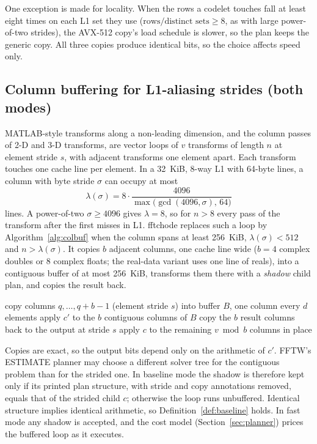 \documentclass[10pt]{article}
\theoremstyle{definition}
\begin{document}
One exception is made for locality. When the rows a codelet touches fall at least eight times on each L1 set they use ($\text{rows}/\text{distinct sets}\ge8$, as with large power-of-two strides), the AVX-512 copy's load schedule is slower, so the plan keeps the generic copy. All three copies produce identical bits, so the choice affects speed only.

\subsection{Column buffering for L1-aliasing strides (both modes)}\label{sec:colbuf}

MATLAB-style transforms along a non-leading dimension, and the column passes of 2-D and 3-D transforms, are vector loops of $v$ transforms of length $n$ at element stride $s$, with adjacent transforms one element apart. Each transform touches one cache line per element. In a 32~KiB, 8-way L1 with 64-byte lines, a column with byte stride $\sigma$ can occupy at most
\begin{equation}
\lambda(\sigma)=8\cdot\frac{4096}{\max\big(\gcd(4096,\sigma),\,64\big)}
\end{equation}
lines. A power-of-two $\sigma\ge4096$ gives $\lambda=8$, so for $n>8$ every pass of the transform after the first misses in L1. fftchode replaces such a loop by Algorithm~\ref{alg:colbuf} when the column spans at least 256~KiB, $\lambda(\sigma)<512$ and $n>\lambda(\sigma)$. It copies $b$ adjacent columns, one cache line wide ($b=4$ complex doubles or 8 complex floats; the real-data variant uses one line of reals), into a contiguous buffer of at most 256~KiB, transforms them there with a \emph{shadow} child plan, and copies the result back.

\begin{algorithm}[t]
\caption{Column-buffered vector loop (strided child plan $c$, shadow plan $c'$)}\label{alg:colbuf}
\begin{algorithmic}[1]
  \State copy columns $q,\dots,q+b-1$ (element stride $s$) into buffer $B$, one column every $d$ elements
  \State apply $c'$ to the $b$ contiguous columns of $B$
  \State copy the $b$ result columns back to the output at stride $s$
\EndFor
\State apply $c$ to the remaining $v \bmod b$ columns in place
\end{algorithmic}
\end{algorithm}

Copies are exact, so the output bits depend only on the arithmetic of $c'$. FFTW's ESTIMATE planner may choose a different solver tree for the contiguous problem than for the strided one. In baseline mode the shadow is therefore kept only if its printed plan structure, with stride and copy annotations removed, equals that of the strided child $c$; otherwise the loop runs unbuffered. Identical structure implies identical arithmetic, so Definition~\ref{def:baseline} holds. In fast mode any shadow is accepted, and the cost model (Section~\ref{sec:planner}) prices the buffered loop as it executes.
\end{document}

